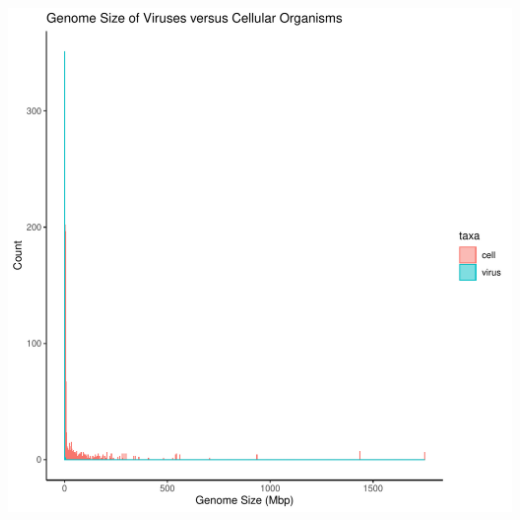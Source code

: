 \documentclass{article}\usepackage[]{graphicx}\usepackage[]{color}
\makeatletter
\def\maxwidth{ %
  \ifdim\Gin@nat@width>\linewidth
    \linewidth
  \else
    \Gin@nat@width
  \fi
}
\newenvironment{knitrout}{}{} %
\makeatother
\begin{document}
\begin{knitrout}
\color{fgcolor}
\includegraphics[width=\maxwidth]{figure/unnamed-chunk-2-1} 

\end{knitrout}
\end{document}
